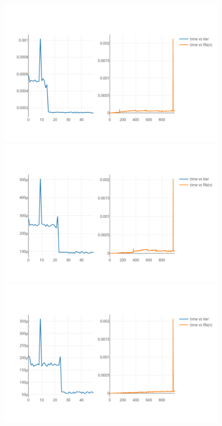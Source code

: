 \documentclass[onecolumn]{preport}
\begin{document}
\begin{figure}[H]
\begin{center}
\begin{minipage}{0.23\columnwidth}
      \subcaption{}
    \end{minipage}
    \begin{minipage}{0.23\columnwidth}   
      \includegraphics[width=\columnwidth]{figs/newplot10.pdf}
      \subcaption{}
    \end{minipage}
    \begin{minipage}{0.23\columnwidth}   
      \includegraphics[width=\columnwidth]{figs/newplot11.pdf}
      \subcaption{}
    \end{minipage}
    \begin{minipage}{0.23\columnwidth}   
      \includegraphics[width=\columnwidth]{figs/newplot12.pdf}

\end{minipage}
\end{center}
\end{figure}
\end{document}
